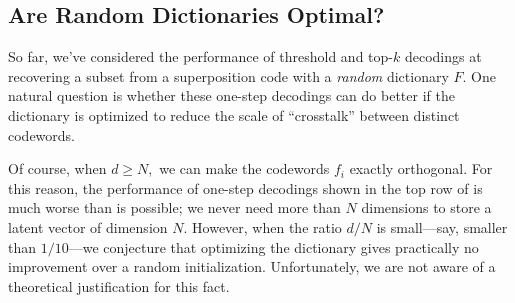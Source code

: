 \subsection{Are Random Dictionaries Optimal? \label{sec:random-optimal}}

So far, we've considered the performance of threshold and top-$k$ decodings at recovering a subset from a superposition code with a \textit{random} dictionary $F$. One natural question is whether these one-step decodings can do better if the dictionary is optimized to reduce the scale of ``crosstalk'' between distinct codewords.

Of course, when $d \ge N,$ we can make the codewords $f_i$ exactly orthogonal. For this reason, the performance of one-step decodings shown in the top row of  is much worse than is possible; we never need more than $N$ dimensions to store a latent vector of dimension $N.$ However, when the ratio $d/N$ is small---say, smaller than $1/10$---we conjecture that optimizing the dictionary gives practically no improvement over a random initialization. Unfortunately, we are not aware of a theoretical justification for this fact.

